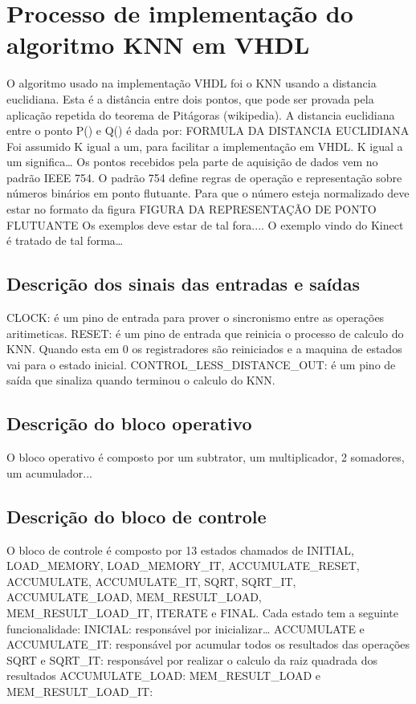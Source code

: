 \documentclass[12pt]{article}
\begin{document}
\section{Processo de implementação do algoritmo KNN em VHDL}

O algoritmo usado na implementação VHDL foi o KNN usando a distancia euclidiana. Esta é a distância entre dois pontos, 
que pode ser provada pela aplicação repetida do teorema de Pitágoras (wikipedia). A distancia euclidiana entre o ponto 
P() e Q() é dada por:
FORMULA DA DISTANCIA EUCLIDIANA
Foi assumido K igual a um, para facilitar a implementação em VHDL. K igual a um significa…
Os pontos recebidos pela parte de aquisição de dados vem no padrão IEEE 754. O padrão 754 define regras de operação e 
representação sobre números binários em ponto flutuante. Para que o número esteja normalizado deve estar no formato da 
figura 
FIGURA DA REPRESENTAÇÃO DE PONTO FLUTUANTE
Os exemplos deve estar de tal fora....
O exemplo vindo do Kinect é tratado de tal forma…

\subsection{Descrição dos sinais das entradas e saídas}

CLOCK: é um pino de entrada para prover o sincronismo entre as operações aritimeticas.
RESET: é um pino de entrada que reinicia o processo de calculo do KNN. Quando esta em 0 os registradores são reiniciados 
e a maquina de estados vai para o estado inicial.
CONTROL_LESS_DISTANCE_OUT: é um pino de saída que sinaliza quando terminou o calculo do KNN.

\subsection{Descrição do bloco operativo}

O bloco operativo é composto por um subtrator, um multiplicador, 2 somadores, um acumulador...

\subsection{Descrição do bloco de controle}

O bloco de controle é composto por 13 estados chamados de INITIAL, LOAD_MEMORY, LOAD_MEMORY_IT, ACCUMULATE_RESET, 
ACCUMULATE, ACCUMULATE_IT, SQRT, SQRT_IT, ACCUMULATE_LOAD, MEM_RESULT_LOAD, MEM_RESULT_LOAD_IT, ITERATE e FINAL. Cada 
estado tem a seguinte funcionalidade:
INICIAL: responsável por inicializar…
ACCUMULATE e ACCUMULATE_IT: responsável por acumular todos os resultados das operações
SQRT e SQRT_IT: responsável por realizar o calculo da raiz quadrada dos resultados
ACCUMULATE_LOAD:
MEM_RESULT_LOAD e MEM_RESULT_LOAD_IT:
\end{document}
